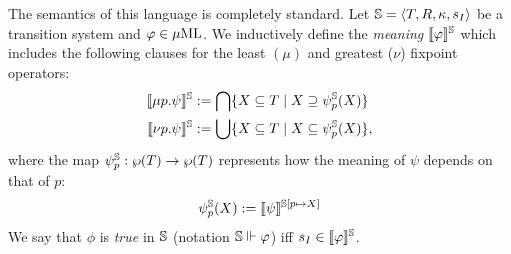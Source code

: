The semantics of this language is completely standard. 
Let $\mathbb{S} = \langle{T,R,\kappa, s_I}\rangle$ be a transition system and $\varphi \in 
\mu\mathrm{ML}$. 
We inductively define the \emph{meaning} $\llbracket\varphi\rrbracket^{\mathbb{S}}$ which includes
the following clauses for the least $(\mu)$ and greatest ($\nu$) fixpoint 
operators:
%
\begin{align*}
   \llbracket\mu p.\psi\rrbracket^{\mathbb{S}}  & \mathrel{:=}  
    \bigcap \{X \subseteq T \mid X \supseteq \psi^{\mathbb{S}}_{p}(X) \}
\\ \llbracket\nu p.\psi\rrbracket^{\mathbb{S}}  & \mathrel{:=}  
    \bigcup \{X \subseteq T \mid X \subseteq \psi^{\mathbb{S}}_{p}(X) \},
\end{align*}
where the map $\psi^{\mathbb{S}}_{p}: \wp(T) \to \wp(T)$ represents how the meaning
of $\psi$ depends on that of $p$:
\[
\psi^{\mathbb{S}}_{p}(X) \mathrel{:=} \llbracket\psi\rrbracket^{\mathbb{S}[p\mapsto X]}
\]
%
We say that $\phi$ is \emph{true} in $\mathbb{S}$ (notation $\mathbb{S} \Vdash \varphi$) iff $s_I \in \llbracket\varphi\rrbracket^{\mathbb{S}}$.%

